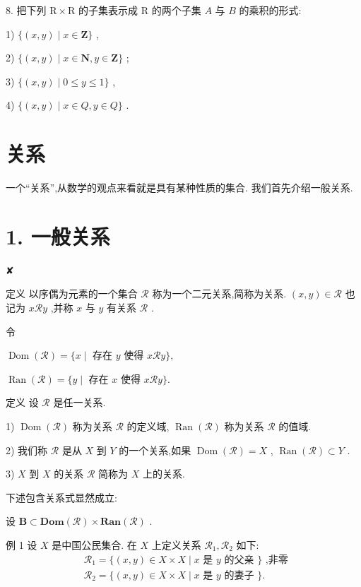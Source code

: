 8. 把下列 $\mathrm{R} \times  \mathrm{R}$ 的子集表示成 $\mathrm{R}$ 的两个子集 $A$ 与 $B$ 的乘积的形式:

1) $\{ \left( {x,y}\right)  \mid  x \in  \mathbf{Z}\}$ ,

2) $\{ \left( {x,y}\right)  \mid  x \in  \mathbf{N},y \in  \mathbf{Z}\}$ ;

3) $\{ \left( {x,y}\right)  \mid  0 \leq  y \leq  1\}$ ,

4) $\{ \left( {x,y}\right)  \mid  x \in  Q,y \in  Q\}$ .

\section{关系}

一个“关系”,从数学的观点来看就是具有某种性质的集合. 我们首先介绍一般关系.

\section*{1. 一般关系}

✘

定义 以序偶为元素的一个集合 $\mathcal{R}$ 称为一个二元关系,简称为关系. $\left( {x,y}\right)  \in  \mathcal{R}$ 也记为 $x\mathcal{R}y$ ,并称 $x$ 与 $y$ 有关系 $\mathcal{R}$ .

令

$\operatorname{Dom}\left( \mathcal{R}\right)  = \{ x \mid$ 存在 $y$ 使得 $x\mathcal{R}y\} ,$

$\operatorname{Ran}\left( \mathcal{R}\right)  = \{ y \mid$ 存在 $x$ 使得 $x\mathcal{R}y\} .$

定义 设 $\mathcal{R}$ 是任一关系.

1) $\operatorname{Dom}\left( \mathcal{R}\right)$ 称为关系 $\mathcal{R}$ 的定义域, $\operatorname{Ran}\left( \mathcal{R}\right)$ 称为关系 $\mathcal{R}$ 的值域.

2) 我们称 $\mathcal{R}$ 是从 $X$ 到 $Y$ 的一个关系,如果 $\operatorname{Dom}\left( \mathcal{R}\right)  = X$ , $\operatorname{Ran}\left( \mathcal{R}\right)  \subset  Y$ .

3) $X$ 到 $X$ 的关系 $\mathcal{R}$ 简称为 $X$ 上的关系.

下述包含关系式显然成立:

设 $\mathbf{B} \subset  \mathbf{{Dom}}\left( \mathcal{R}\right)  \times  \mathbf{{Ran}}\left( \mathcal{R}\right)$ .

例 1 设 $X$ 是中国公民集合. 在 $X$ 上定义关系 ${\mathcal{R}}_{1},{\mathcal{R}}_{2}$ 如下:
\begin{align*}
	&{\mathcal{R}}_{1} = \{ \left( {x,y}\right)  \in  X \times  X \mid  x\text{ 是 }y\text{ 的父亲 }\} \text{ ,非零 }\\
	&{\mathcal{R}}_{2} = \{ \left( {x,y}\right)  \in  X \times  X \mid  x\text{ 是 }y\text{ 的妻子 }\} .
\end{align*}

